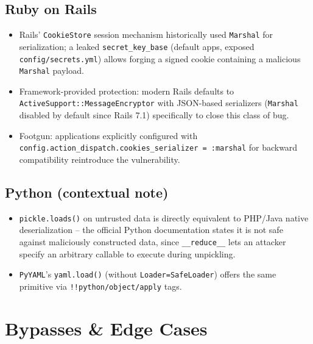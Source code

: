\documentclass[11pt]{article}
\begin{document}
\subsection{Ruby on Rails}
\begin{itemize}
    \item Rails' \texttt{CookieStore} session mechanism historically used \texttt{Marshal} for serialization; a leaked \texttt{secret\_key\_base} (default apps, exposed \texttt{config/secrets.yml}) allows forging a signed cookie containing a malicious \texttt{Marshal} payload.
    \item Framework-provided protection: modern Rails defaults to \texttt{ActiveSupport::MessageEncryptor} with JSON-based serializers (\texttt{Marshal} disabled by default since Rails 7.1) specifically to close this class of bug.
    \item Footgun: applications explicitly configured with \\ \verb|config.action_dispatch.cookies_serializer = :marshal| for backward compatibility reintroduce the vulnerability.
\end{itemize}

\subsection{Python (contextual note)}
\begin{itemize}
    \item \texttt{pickle.loads()} on untrusted data is directly equivalent to PHP/Java native deserialization -- the official Python documentation states it is not safe against maliciously constructed data, since \verb|__reduce__| lets an attacker specify an arbitrary callable to execute during unpickling.
    \item \texttt{PyYAML}'s \verb|yaml.load()| (without \verb|Loader=SafeLoader|) offers the same primitive via \texttt{!!python/object/apply} tags.
\end{itemize}

\section{Bypasses \& Edge Cases}
\end{document}
